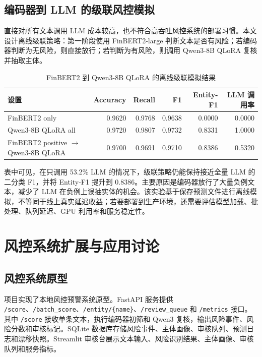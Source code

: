 \documentclass[UTF8,a4paper,12pt]{ctexart}
\begin{document}
\subsection{编码器到 LLM 的级联风控模拟}

直接对所有文本调用 LLM 成本较高，也不符合高吞吐风控系统的部署习惯。本文设计离线级联策略：第一阶段使用 FinBERT2-large 判断文本是否有风险；若编码器判断为无风险，则直接放行；若判断为有风险，则调用 Qwen3-8B QLoRA 复核并抽取主体。

\begin{table}[H]
\centering
\caption{FinBERT2 到 Qwen3-8B QLoRA 的离线级联模拟结果}
\label{tab:cascade}
\small
\begin{tabular}{>{\raggedright\arraybackslash}p{4.8cm}rrrrr}
\toprule
设置 & Accuracy & Recall & F1 & Entity-F1 & LLM 调用率 \\
\midrule
FinBERT2 only & 0.9620 & 0.9768 & 0.9638 & 0.0000 & 0.0000 \\
Qwen3-8B QLoRA all & 0.9720 & 0.9807 & 0.9732 & 0.8331 & 1.0000 \\
FinBERT2 positive $\rightarrow$ Qwen3-8B QLoRA & 0.9700 & 0.9691 & 0.9710 & 0.8386 & 0.5320 \\
\bottomrule
\end{tabular}
\end{table}

表中可见，在只调用 53.2\% LLM 的情况下，级联策略仍能保持接近全量 LLM 的二分类 F1，并将 Entity-F1 提升到 0.8386。主要原因是编码器放行了大量负例文本，减少了 LLM 在负例上误抽实体的机会。该实验基于保存预测文件进行离线模拟，不等同于线上真实延迟收益；若要部署到生产环境，还需要评估模型加载、批处理、队列延迟、GPU 利用率和服务稳定性。

\section{风控系统扩展与应用讨论}

\subsection{风控系统原型}

项目实现了本地风控预警系统原型。FastAPI 服务提供 \texttt{/score}、\texttt{/batch\_score}、\texttt{/entity/\{name\}}、\texttt{/review\_queue} 和 \texttt{/metrics} 接口。其中 \texttt{/score} 接收单条文本，执行编码器初筛和 Qwen3 复核，输出风险事件、风险分数和审核标记。SQLite 数据库存储风险事件、主体画像、审核队列、预测日志和漂移快照。Streamlit 审核台展示文本输入、风险识别结果、主体画像、审核队列和服务指标。
\end{document}
